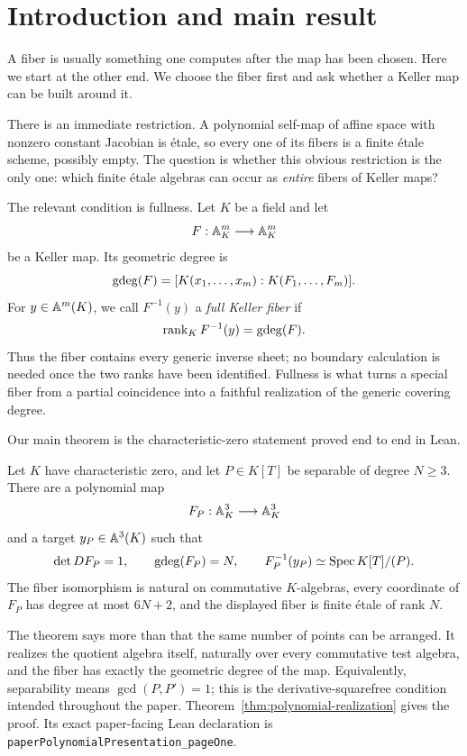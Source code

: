 \section{Introduction and main result}

A fiber is usually something one computes after the map has been chosen.
Here we start at the other end.  We choose the fiber first and ask whether a
Keller map can be built around it.

There is an immediate restriction.  A polynomial self-map of affine space
with nonzero constant Jacobian is \'etale, so every one of its fibers is a
finite \'etale scheme, possibly empty.  The question is whether this obvious
restriction is the only one: which finite \'etale algebras can occur as
\emph{entire} fibers of Keller maps?

The relevant condition is fullness.  Let \(K\) be a field and let
\[
 F:\mathbb A^m_K\longrightarrow\mathbb A^m_K
\]
be a Keller map.  Its geometric degree is
\[
 \operatorname{gdeg}(F)=[K(x_1,\ldots,x_m):K(F_1,\ldots,F_m)].
\]
For \(y\in\mathbb A^m(K)\), we call \(F^{-1}(y)\) a \emph{full Keller fiber} if
\[
 \operatorname{rank}_K F^{-1}(y)=\operatorname{gdeg}(F).
\]
Thus the fiber contains every generic inverse sheet; no boundary calculation
is needed once the two ranks have been identified.  Fullness is what turns a
special fiber from a partial coincidence into a faithful realization of the
generic covering degree.

Our main theorem is the characteristic-zero statement proved end to end in
Lean.

\begin{theorem}
\label{thm:main-intro}
Let \(K\) have characteristic zero, and let \(P\in K[T]\) be separable of
degree \(N\geq3\).  There are a polynomial map
\[
 F_P:\mathbb A^3_K\longrightarrow\mathbb A^3_K
\]
and a target \(y_P\in\mathbb A^3(K)\) such that
\[
 \det DF_P=1,\qquad
 \operatorname{gdeg}(F_P)=N,\qquad
 F_P^{-1}(y_P)\simeq\operatorname{Spec} K[T]/(P).
\]
The fiber isomorphism is natural on commutative \(K\)-algebras, every
coordinate of \(F_P\) has degree at most \(6N+2\), and the displayed fiber is
finite \'etale of rank \(N\).
\end{theorem}

The theorem says more than that the same number of points can be arranged.
It realizes the quotient algebra itself, naturally over every commutative
test algebra, and the fiber has exactly the geometric degree of the map.
Equivalently, separability means \(\gcd(P,P')=1\); this is the
derivative-squarefree condition intended throughout the paper.
Theorem~\ref{thm:polynomial-realization} gives the proof.  Its exact
paper-facing Lean declaration is
\texttt{paperPolynomialPresentation\_pageOne}.

